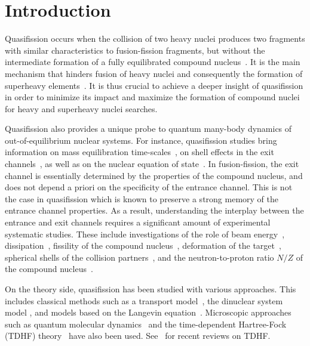 \documentclass[reprint,aps,prc,twocolumn,floatfix,10pt]{revtex4-2}
\begin{document}

\section{Introduction}

Quasifission occurs when the collision of two heavy nuclei produces two fragments with similar characteristics to fusion-fission fragments, but without the intermediate formation of a fully equilibrated compound nucleus~\cite{heusch1978,back1981,back1983,bock1982}.
It is the main mechanism that hinders fusion of heavy nuclei and consequently the formation of
superheavy elements~\cite{sahm1984,gaggeler1984,schmidt1991,back2014,khuyagbaatar2018,banerjee2019}.
It is thus crucial to achieve a deeper insight of quasifission in order to minimize its impact and maximize the formation of compound nuclei for heavy and superheavy nuclei searches.

Quasifission also provides a unique probe to quantum many-body dynamics of out-of-equilibrium nuclear systems.
For instance, quasifission studies bring information on mass equilibration time-scales~\cite{toke1985,shen1987,durietz2011}, on shell effects in the exit channels~\cite{itkis2004,nishio2008,kozulin2014,wakhle2014,morjean2017}, as well as on the nuclear equation of state~\cite{veselsky2016,zheng2018}.
In fusion-fission, the exit channel is essentially determined by the properties of the compound nucleus, and does not depend a priori on the specificity of the entrance channel.
This is not the case in quasifission which is known to preserve a strong memory of the entrance channel properties.
As a result, understanding the interplay between the entrance and exit channels requires a significant amount of experimental systematic studies.
These include investigations of the role of beam energy~\cite{back1996,nishio2008,nishio2012}, dissipation~\cite{williams2018}, fissility of the compound nucleus~\cite{lin2012,durietz2013},
deformation of the target~\cite{hinde1995,hinde1996,knyazheva2007,hinde2008,nishio2008},
spherical shells of the collision partners~\cite{simenel2012b,mohanto2018}, and the neutron-to-proton ratio
$N/Z$ of the compound nucleus~\cite{hammerton2015,hammerton2019}.

On the theory side, quasifission has been studied with various approaches.
This includes classical methods such as
a transport model~\cite{diaz-torres2001}, the dinuclear system model \cite{adamian2003,huang2010,bao2015,guo2018c}, and models based on the Langevin equation~\cite{zagrebaev2005,aritomo2009,aritomo2012,karpov2017,sekizawa2019b}.
Microscopic approaches such as quantum molecular dynamics~\cite{wen2013,wang2016,zhao2016} and the
time-dependent Hartree-Fock (TDHF) theory~\cite{golabek2009,kedziora2010,wakhle2014,oberacker2014,hammerton2015,umar2015a,umar2016,sekizawa2016,yu2017,ayik2017,ayik2018,sekizawa2017a,wakhle2018,morjean2017,sekizawa2019b} have also been used. See~\cite{simenel2012,simenel2018,sekizawa2019,stevenson2019} for recent reviews on TDHF.
\end{document}
